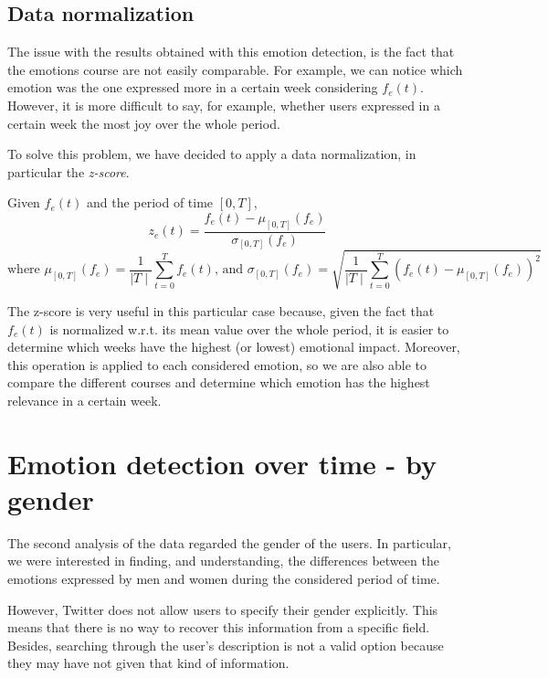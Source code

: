 \subsection{Data normalization}
\label{subsec:normalization}

The issue with the results obtained with this emotion detection, is the fact that the emotions course are not easily comparable. For example, we can notice which emotion was the one expressed more in a certain week considering \(f_e(t)\). However, it is more difficult to say, for example, whether users expressed in a certain week the most joy over the whole period.

To solve this problem, we have decided to apply a data normalization, in particular the \textit{z-score}.

\begin{definition}
	Given \(f_e(t)\) and the period of time \([0,T]\),   
	\[z_e(t) = \frac{f_e(t) - \mu_{[0,T]}(f_e)}{\sigma_{[0,T]}(f_e)}\] 
	\[\text{where } \mu_{[0,T]}(f_e) = \frac{1}{\mid T \mid} \sum_{t =0}^{T} f_e(t) \text{, and } \sigma_{[0,T]}(f_e) = \sqrt{\frac{1}{\mid T \mid} \sum_{t = 0}^{T} \left( f_e(t) - \mu_{[0,T]}(f_e) \right)^2 }\] 
\end{definition}

The z-score is very useful in this particular case because, given the fact that \(f_e(t)\) is normalized w.r.t. its mean value over the whole period, it is easier to determine which weeks have the highest (or lowest) emotional impact. Moreover, this operation is applied to each considered emotion, so we are also able to compare the different courses and determine which emotion has the highest relevance in a certain week.

\section{Emotion detection over time - by gender}
\label{sec:emotion-by-gender}

The second analysis of the data regarded the gender of the users. In particular, we were interested in finding, and understanding, the differences between the emotions expressed by men and women during the considered period of time.

However, Twitter does not allow users to specify their gender explicitly. This means that there is no way to recover this information from a specific field. Besides, searching through the user's description is not a valid option because they may have not given that kind of information. 

